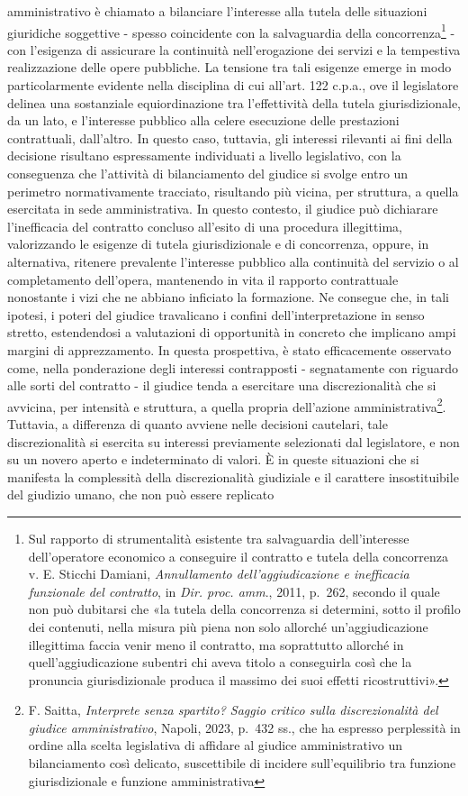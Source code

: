 \documentclass[american,a4paper,]{article}
\begin{document}
amministrativo è chiamato a bilanciare l'interesse alla tutela delle situazioni giuridiche soggettive - spesso coincidente con la salvaguardia della concorrenza\footnote{Sul rapporto di strumentalità esistente tra salvaguardia dell'interesse dell'operatore economico a conseguire il contratto e tutela della concorrenza v. E. Sticchi Damiani, \emph{Annullamento dell'aggiudicazione e inefficacia funzionale del contratto}, in \emph{Dir. proc. amm}., 2011, p.~262, secondo il quale non può dubitarsi che «la tutela della concorrenza si determini, sotto il profilo dei contenuti, nella misura più piena non solo allorché un'aggiudicazione illegittima faccia venir meno il contratto, ma soprattutto allorché in quell'aggiudicazione subentri chi aveva titolo a conseguirla così che la pronuncia giurisdizionale produca il massimo dei suoi effetti ricostruttivi».} - con l'esigenza di assicurare la continuità nell'erogazione dei servizi e la tempestiva realizzazione delle opere pubbliche. La tensione tra tali esigenze emerge in modo particolarmente evidente nella disciplina di cui all'art. 122 c.p.a., ove il legislatore delinea una sostanziale equiordinazione tra l'effettività della tutela giurisdizionale, da un lato, e l'interesse pubblico alla celere esecuzione delle prestazioni contrattuali, dall'altro. In questo caso, tuttavia, gli interessi rilevanti ai fini della decisione risultano espressamente individuati a livello legislativo, con la conseguenza che l'attività di bilanciamento del giudice si svolge entro un perimetro normativamente tracciato, risultando più vicina, per struttura, a quella esercitata in sede amministrativa. In questo contesto, il giudice può dichiarare l'inefficacia del contratto concluso all'esito di una procedura illegittima, valorizzando le esigenze di tutela giurisdizionale e di concorrenza, oppure, in alternativa, ritenere prevalente l'interesse pubblico alla continuità del servizio o al completamento dell'opera, mantenendo in vita il rapporto contrattuale nonostante i vizi che ne abbiano inficiato la formazione. Ne consegue che, in tali ipotesi, i poteri del giudice travalicano i confini dell'interpretazione in senso stretto, estendendosi a valutazioni di opportunità in concreto che implicano ampi margini di apprezzamento. In questa prospettiva, è stato efficacemente osservato come, nella ponderazione degli interessi contrapposti - segnatamente con riguardo alle sorti del contratto - il giudice tenda a esercitare una discrezionalità che si avvicina, per intensità e struttura, a quella propria dell'azione amministrativa\footnote{F. Saitta, \emph{Interprete senza spartito? Saggio critico sulla discrezionalità del giudice amministrativo}, Napoli, 2023, p.~432 ss., che ha espresso perplessità in ordine alla scelta legislativa di affidare al giudice amministrativo un bilanciamento così delicato, suscettibile di incidere sull'equilibrio tra funzione giurisdizionale e funzione amministrativa}. Tuttavia, a differenza di quanto avviene nelle decisioni cautelari, tale discrezionalità si esercita su interessi previamente selezionati dal legislatore, e non su un novero aperto e indeterminato di valori. È in queste situazioni che si manifesta la complessità della discrezionalità giudiziale e il carattere insostituibile del giudizio umano, che non può essere replicato 
\end{document}
